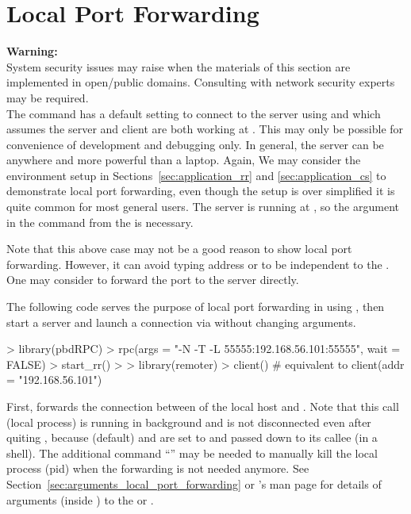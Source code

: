 \section[Local Port Forwarding]{Local Port Forwarding}
\label{sec:local_port_forwarding}

{\color{red} \bf Warning:}\\
System security issues may raise when the materials of this section are
implemented in open/public domains. Consulting with network security experts
may be required.
\\

The  command  has a default setting
to connect to the  server using  and
 which assumes the  server and client are
both working at .
This may only be possible for convenience of development and debugging only.
In general, the server can be anywhere and more powerful than a laptop.
Again, We may consider the environment setup in
Sections~\ref{sec:application_rr} and \ref{sec:application_cs} to
demonstrate local port forwarding, even though the setup is over simplified
it is quite common for most general users.
The server is running at , so the argument
 in the 
command  from the 
is necessary.

Note that this above case may not be a good reason to show local port
forwarding.
However, it can avoid typing address or to be independent to the .
One may consider to forward the  port  to the
server directly.

The following code serves the purpose of local port forwarding in
 using , then start a  server and
launch a connection via  without changing arguments.
\begin{Code}[title=Forward \code{localhost:55555} to \code{192.168.56.101:55555}]
> library(pbdRPC)
> rpc(args = "-N -T -L 55555:192.168.56.101:55555", wait = FALSE)
> start_rr()
>
> library(remoter)
> client()    # equivalent to client(addr = "192.168.56.101")
\end{Code}

First, 
forwards the connection between  of the local host and
.
Note that this call (local process) is running in background and is
not disconnected even after quiting ,
because  (default) and {\color{red} }
are set to  and passed down to its callee (in a shell).
{\color{red}
The additional command ``'' may be needed to manually
kill the local process (pid) when the forwarding is not needed anymore.
}
See Section~\ref{sec:arguments_local_port_forwarding} or
's man page for details of arguments 
(inside ) to the  or .

